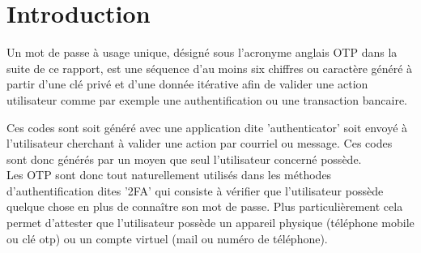 \documentclass[a4paper, 10pt]{article}
\newcommand{\otp}{\textsc{OTP} }
\newcommand{\totp}{\textsc{TOTP} }
\newcommand{\hotp}{\textsc{HOTP} }
\begin{document}
\newpage

\tableofcontents
\newpage

\begin{abstract}
Ce rapport introduit les différents concepts inhérents à \textcolor{mygreen}{l'algorithme \otp} en prenant l'exemple de son utilisation dans le \textcolor{myblue}{protocole 2FA}. Ensuite il explique en détaille et en déroulant un exemple concret, les différentes partie de l'algorithme permettant de générer un \otp à partir d'une \textcolor{mygreen}{clé privé} partagé et d'une \textcolor{mygreen}{donnée incrémentale}. Puis il montre la mise en place du 2FA avec les deux \textcolor{myblue}{variantes} d'\otp, \textcolor{myblue}{\hotp} et \textcolor{myblue}{\totp}, sur un prototype réalisé en \textcolor{myblue}{python}. Finalement, ce rapport conclus en mettant en exergue les \textcolor{myblue}{failles de sécurités} possible à l'utilisation d'\otp et quelles sont les bonnes pratiques à mettre en place pour s'en prémunir.
\end{abstract}
\newpage


    \section*{Introduction}



    Un \textcolor{myblue}{mot de passe à usage unique}, désigné sous l'acronyme anglais \textcolor{myblue}{\otp} dans la suite de ce rapport, 
est une séquence d'au moins \textcolor{mygreen}{six chiffres} ou caractère généré à partir d'une \textcolor{mygreen}{clé privé} et d'une \textcolor{mygreen}{donnée itérative}
afin de \textcolor{myblue}{valider une action} utilisateur comme par exemple une authentification ou une transaction bancaire. 

    Ces codes sont soit généré avec une \textcolor{myblue}{application} dite 'authenticator' soit \textcolor{myblue}{envoyé} à l'utilisateur cherchant
à valider une action par courriel ou message. Ces codes sont donc générés par un moyen que \textcolor{mygreen}{seul l'utilisateur concerné possède}.\\


    Les \otp  sont donc tout naturellement utilisés dans les méthodes d'authentification dites '\textcolor{myblue}{2FA}'  qui consiste à vérifier que
l'utilisateur \textcolor{myblue}{possède quelque chose} en plus de connaître son mot de passe.
Plus particulièrement cela permet d'attester que l'utilisateur possède \textcolor{mygreen}{un appareil physique} (téléphone mobile ou clé otp) ou \textcolor{mygreen}{un compte virtuel} (mail ou numéro de téléphone).\\
\end{document}
